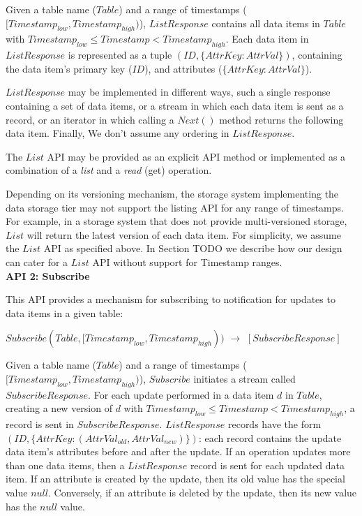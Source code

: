 \noindent
Given a table name ($Table$) and a range of timestamps ($[Timestamp_{low}, Timestamp_{high})$),
$ListResponse$ contains all data items in $Table$ with $Timestamp_{low} \leq Timestamp < Timestamp_{high}$.
Each data item in $ListResponse$ is represented as a tuple $(ID, \{AttrKey: AttrVal\})$, containing the data item's
primary key ($ID$), and attributes ($\{AttrKey: AttrVal\}$).

$ListResponse$ may be implemented in different ways, such a single response containing a set of
data items, or a stream in which each data item is sent as a record, or an iterator in which calling a $Next()$ method
returns the following data item.
Finally, We don't assume any ordering in $ListResponse$.

The $List$ API may be provided as an explicit API method or implemented as a combination of a \textit{list} and a
\textit{read} (get) operation.

Depending on its versioning mechanism, the storage system implementing the data storage tier may not support the
listing API for any range of timestamps.
For example, in a storage system that does not provide multi-versioned storage, $List$ will return the latest version of
each data item.
For simplicity, we assume the $List$ API as specified above.
In Section
TODO
we describe how our design can cater for a $List$ API without support for Timestamp ranges.
\\

\noindent
\textbf{API 2: Subscribe}

\noindent
This API provides a mechanism for subscribing to notification for updates to data items in a given table:

$Subscribe(Table, [Timestamp_{low}, Timestamp_{high}))$ $\rightarrow$ $[SubscribeResponse]$

\noindent
Given a table name ($Table$) and a range of timestamps ($[Timestamp_{low}, Timestamp_{high})$),
$Subscribe$ initiates a stream called $SubscribeResponse$.
For each update performed in a data item $d$ in $Table$, creating a new version of $d$ with
$Timestamp_{low} \leq Timestamp < Timestamp_{high}$, a record is sent in $SubscribeResponse$.
$ListResponse$ records have the form $(ID, \{AttrKey: (AttrVal_{old}, AttrVal_{new})\})$:
each record contains the update data item's attributes before and after the update.
If an operation updates more than one data items, then a $ListResponse$ record is sent for each updated
data item.
If an attribute is created by the update, then its old value has the special value $null$.
Conversely, if an attribute is deleted by the update, then its new value has the $null$ value.

